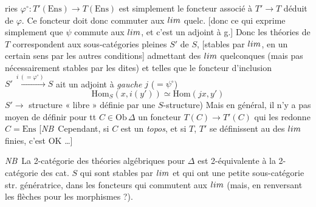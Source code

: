 \documentclass[11pt,a4paper]{article}
\begin{document}
ries $\varphi^{\circ} : T'(\mathrm{Ens}) \to T(\mathrm{Ens})$ est
simplement le foncteur associé à $T' \to T$ déduit de $\varphi$. Ce
foncteur doit donc commuter aux $\varprojlim$ quelc. [donc ce qui
exprime simplement que $\psi$ commute aux $\varinjlim$, 
et c'est un adjoint à g.] Donc les théories de $T$
correspondent aux sous-catégories pleines $S'$ de $S$,  [stables par $\varprojlim$, en un certain sens \ill{} par les
autres conditions] admettant des \emph{$\varprojlim$} quelconques
(mais pas nécessairement stables par les dites) et telles que le
foncteur d'inclusion $S' \xrightarrow{\ i\ (=\varphi^{\circ})\ } S$ ait
un adjoint à \emph{gauche} $j$ ($= \psi^{\circ}$)
\[
  \mathrm{Hom}_{S}(x, i(y')) \simeq \mathrm{Hom}(jx, y')
\]
 \struck{[Mais en
général ? \ill{} (Structure (foncteurs $S'$ $S$-structure)}
 $S' \to$
structure « libre » définie par une $S$-structure) Mais en général, il
n'y a pas moyen de définir pour tt $C \in \mathrm{Ob}\,\Delta$ un
foncteur $T(C) \to T'(C)$ qui les redonne  $C =
\mathrm{Ens}$ [\emph{NB}\ Cependant, si $C$ est un
\emph{topos}, et si $T$, $T'$ se définissent au 
des $\varprojlim$ finies, c'est OK …]

\emph{NB}\ La 2-catégorie des théories algébriques pour $\Delta$
est 2-équivalente à la 2-catégorie des cat. $S$ qui sont stables par
$\varprojlim$   et qui ont une petite
sous-catégorie str. génératrice, dans les foncteurs qui commutent aux
$\varprojlim$ (mais, en renversant les flèches pour les morphismes ?).
 
\end{document}
